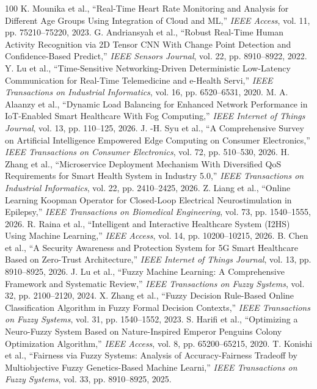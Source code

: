\documentclass[journal]{IEEEtran}
\begin{document}
\begin{thebibliography}{100}
 K. Mounika et al., ``Real-Time Heart Rate Monitoring and Analysis for Different Age Groups Using Integration of Cloud and ML,'' \emph{IEEE Access}, vol. 11, pp. 75210--75220, 2023.
 G. Andriansyah et al., ``Robust Real-Time Human Activity Recognition via 2D Tensor CNN With Change Point Detection and Confidence-Based Predict,'' \emph{IEEE Sensors Journal}, vol. 22, pp. 8910--8922, 2022.
 Y. Lu et al., ``Time-Sensitive Networking-Driven Deterministic Low-Latency Communication for Real-Time Telemedicine and e-Health Servi,'' \emph{IEEE Transactions on Industrial Informatics}, vol. 16, pp. 6520--6531, 2020.
 M. A. Alaanzy et al., ``Dynamic Load Balancing for Enhanced Network Performance in IoT-Enabled Smart Healthcare With Fog Computing,'' \emph{IEEE Internet of Things Journal}, vol. 13, pp. 110--125, 2026.
 J. -H. Syu et al., ``A Comprehensive Survey on Artificial Intelligence Empowered Edge Computing on Consumer Electronics,'' \emph{IEEE Transactions on Consumer Electronics}, vol. 72, pp. 510--530, 2026.
 H. Zhang et al., ``Microservice Deployment Mechanism With Diversified QoS Requirements for Smart Health System in Industry 5.0,'' \emph{IEEE Transactions on Industrial Informatics}, vol. 22, pp. 2410--2425, 2026.
 Z. Liang et al., ``Online Learning Koopman Operator for Closed-Loop Electrical Neurostimulation in Epilepsy,'' \emph{IEEE Transactions on Biomedical Engineering}, vol. 73, pp. 1540--1555, 2026.
 R. Raina et al., ``Intelligent and Interactive Healthcare System (I2HS) Using Machine Learning,'' \emph{IEEE Access}, vol. 14, pp. 10200--10215, 2026.
 B. Chen et al., ``A Security Awareness and Protection System for 5G Smart Healthcare Based on Zero-Trust Architecture,'' \emph{IEEE Internet of Things Journal}, vol. 13, pp. 8910--8925, 2026.
 J. Lu et al., ``Fuzzy Machine Learning: A Comprehensive Framework and Systematic Review,'' \emph{IEEE Transactions on Fuzzy Systems}, vol. 32, pp. 2100--2120, 2024.
 X. Zhang et al., ``Fuzzy Decision Rule-Based Online Classification Algorithm in Fuzzy Formal Decision Contexts,'' \emph{IEEE Transactions on Fuzzy Systems}, vol. 31, pp. 1540--1552, 2023.
 S. Harifi et al., ``Optimizing a Neuro-Fuzzy System Based on Nature-Inspired Emperor Penguins Colony Optimization Algorithm,'' \emph{IEEE Access}, vol. 8, pp. 65200--65215, 2020.
 T. Konishi et al., ``Fairness via Fuzzy Systems: Analysis of Accuracy-Fairness Tradeoff by Multiobjective Fuzzy Genetics-Based Machine Learni,'' \emph{IEEE Transactions on Fuzzy Systems}, vol. 33, pp. 8910--8925, 2025.

\end{thebibliography}
\end{document}
